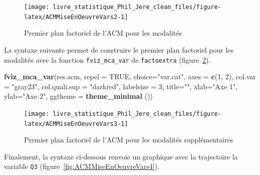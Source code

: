 \documentclass[
  11pt,
  french,
]{book}
\makeatletter
\newenvironment{Shaded}{\begin{snugshade}}{\end{snugshade}}
\newcommand{\DataTypeTok}[1]{\textcolor[rgb]{0.13,0.29,0.53}{#1}}
\newcommand{\DecValTok}[1]{\textcolor[rgb]{0.00,0.00,0.81}{#1}}
\newcommand{\KeywordTok}[1]{\textcolor[rgb]{0.13,0.29,0.53}{\textbf{#1}}}
\newcommand{\NormalTok}[1]{#1}
\newcommand{\OtherTok}[1]{\textcolor[rgb]{0.56,0.35,0.01}{#1}}
\newcommand{\StringTok}[1]{\textcolor[rgb]{0.31,0.60,0.02}{#1}}
\newenvironment{kframe}{%
\medskip{}
\setlength{\fboxsep}{.8em}
 \def\at@end@of@kframe{}%
 \ifinner\ifhmode%
  \def\at@end@of@kframe{\end{minipage}}%
  \begin{minipage}{\columnwidth}%
 \fi\fi%
 \def\FrameCommand##1{\hskip\@totalleftmargin \hskip-\fboxsep
 \colorbox{shadecolor}{##1}\hskip-\fboxsep
     \hskip-\linewidth \hskip-\@totalleftmargin \hskip\columnwidth}%
 \MakeFramed {\advance\hsize-\width
   \@totalleftmargin\z@ \linewidth\hsize
   \@setminipage}}%
 {\par\unskip\endMakeFramed%
 \at@end@of@kframe}
\renewenvironment{Shaded}{\begin{kframe}}{\end{kframe}}
\makeatother
\begin{document}
\begin{figure}

{\centering \texttt{[image: livre\_statistique\_Phil\_Jere\_clean\_files/figure-latex/ACMMiseEnOeuvreVars2-1]} 

}

\caption{Premier plan factoriel de l'ACM pour les modalités}\label{fig:ACMMiseEnOeuvreVars2}
\end{figure}

La syntaxe suivante permet de construire le premier plan factoriel pour les modalités avec la fonction \texttt{fviz\_mca\_var} de \texttt{factoextra} (figure~\ref{fig:ACMMiseEnOeuvreVars3}).

\begin{Shaded}
\begin{Highlighting}[]
\KeywordTok{fviz_mca_var}\NormalTok{(res.acm, }\DataTypeTok{repel =} \OtherTok{TRUE}\NormalTok{,}
             \DataTypeTok{choice=}\StringTok{"var.cat"}\NormalTok{,}
             \DataTypeTok{axes =} \KeywordTok{c}\NormalTok{(}\DecValTok{1}\NormalTok{, }\DecValTok{2}\NormalTok{),}
             \DataTypeTok{col.var =} \StringTok{"gray23"}\NormalTok{,}
             \DataTypeTok{col.quali.sup =} \StringTok{"darkred"}\NormalTok{,}
             \DataTypeTok{labelsize =} \DecValTok{3}\NormalTok{,}
             \DataTypeTok{title=}\StringTok{""}\NormalTok{, }\DataTypeTok{xlab=}\StringTok{"Axe 1"}\NormalTok{, }\DataTypeTok{ylab=}\StringTok{"Axe 2"}\NormalTok{, }
             \DataTypeTok{ggtheme =} \KeywordTok{theme_minimal}\NormalTok{ ())}
\end{Highlighting}
\end{Shaded}

\begin{figure}

{\centering \texttt{[image: livre\_statistique\_Phil\_Jere\_clean\_files/figure-latex/ACMMiseEnOeuvreVars3-1]} 

}

\caption{Premier plan factoriel de l'ACM pour les modalités supplémentaires}\label{fig:ACMMiseEnOeuvreVars3}
\end{figure}

Finalement, la syntaxe ci-dessous renvoie un graphique avec la trajectoire la variable \texttt{Q3} (figure~\ref{fig:ACMMiseEnOeuvreVars4}).
\end{document}
